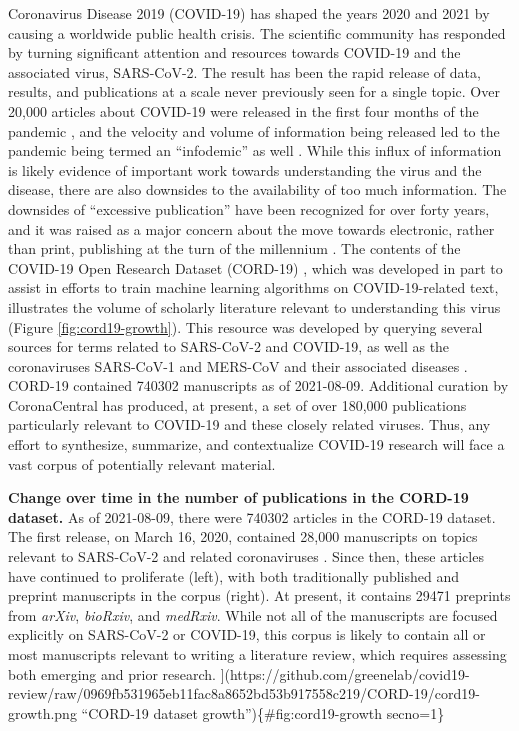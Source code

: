 \documentclass[twocolumn]{ceurart}
\begin{document}
Coronavirus Disease 2019 (COVID-19) has shaped the years 2020 and 2021 by causing a worldwide public health crisis.
The scientific community has responded by turning significant attention and resources towards COVID-19 and the associated virus, SARS-CoV-2.
The result has been the rapid release of data, results, and publications at a scale never previously seen for a single topic.
Over 20,000 articles about COVID-19 were released in the first four months of the pandemic \citep{7ub6VM4Z}, and the velocity and volume of information being released led to the pandemic being termed an ``infodemic'' as well \citep{7ub6VM4Z, nnfOazAC}.
While this influx of information is likely evidence of important work towards understanding the virus and the disease, there are also downsides to the availability of too much information.
The downsides of ``excessive publication'' have been recognized for over forty years, and it was raised as a major concern about the move towards electronic, rather than print, publishing at the turn of the millennium \citep{DfSr1Ohc}.
The contents of the COVID-19 Open Research Dataset (CORD-19) \citep{CiOwklc6}, which was developed in part to assist in efforts to train machine learning algorithms on COVID-19-related text, illustrates the volume of scholarly literature relevant to understanding this virus (Figure \ref{fig:cord19-growth}).
This resource was developed by querying several sources for terms related to SARS-CoV-2 and COVID-19, as well as the coronaviruses SARS-CoV-1 and MERS-CoV and their associated diseases \citep{CiOwklc6}.
CORD-19 contained 740302 manuscripts as of 2021-08-09.
Additional curation by CoronaCentral \citep{zQ1JIn2J} has produced, at present, a set of over 180,000 publications particularly relevant to COVID-19 and these closely related viruses.
Thus, any effort to synthesize, summarize, and contextualize COVID-19 research will face a vast corpus of potentially relevant material.

\textbf{Change over time in the number of publications in the CORD-19 dataset.}
As of 2021-08-09, there were 740302 articles in the CORD-19 dataset.
The first release, on March 16, 2020, contained 28,000 manuscripts on topics relevant to SARS-CoV-2 and related coronaviruses \citep{CiOwklc6}.
Since then, these articles have continued to proliferate (left), with both traditionally published and preprint manuscripts in the corpus (right).
At present, it contains 29471 preprints from \emph{arXiv}, \emph{bioRxiv}, and \emph{medRxiv}.
While not all of the manuscripts are focused explicitly on SARS-CoV-2 or COVID-19, this corpus is likely to contain all or most manuscripts relevant to writing a literature review, which requires assessing both emerging and prior research.
{]}(https://github.com/greenelab/covid19-review/raw/0969fb531965eb11fac8a8652bd53b917558c219/CORD-19/cord19-growth.png ``CORD-19 dataset growth'')\{\#fig:cord19-growth secno=1\}
\end{document}

